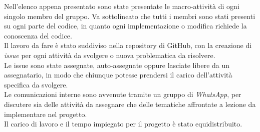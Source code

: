 Nell'elenco appena presentato sono state presentate le macro-attività di ogni singolo membro del gruppo. 
Va sottolineato che tutti i membri sono stati presenti su ogni parte del codice, in quanto ogni implementazione o modifica richiede
la conoscenza del codice.\\
Il lavoro da fare è stato suddiviso nella repository di GitHub, con la creazione di \emph{issue} per ogni attività 
da svolgere o nuova problematica da risolvere.\\
Le issue sono state assegnate, auto-assegnate oppure lasciate libere da un assegnatario, in modo che chiunque potesse 
prendersi il carico dell'attività specifica da svolgere.\\
Le comunicazioni interne sono avvenute tramite un gruppo di \emph{WhatsApp}, per discutere sia delle attività da assegnare che 
delle tematiche affrontate a lezione da implementare nel progetto.\\
Il carico di lavoro e il tempo impiegato per il progetto è stato equidistribuito.\\

 